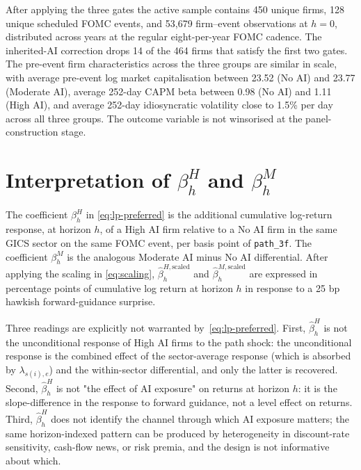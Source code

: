 After applying the three gates the active sample contains 450 unique firms, 128 unique scheduled FOMC events, and 53{,}679 firm--event observations at $h=0$, distributed across years at the regular eight-per-year FOMC cadence. The inherited-AI correction drops 14 of the 464 firms that satisfy the first two gates.
The pre-event firm characteristics across the three groups are similar in scale, with average pre-event log market capitalisation between 23.52 (No AI) and 23.77 (Moderate AI), average 252-day CAPM beta between 0.98 (No AI) and 1.11 (High AI), and average 252-day idiosyncratic volatility close to 1.5\% per day across all three groups. The outcome variable is not winsorised at the panel-construction stage.

\section{Interpretation of \texorpdfstring{$\beta_h^H$}{betaH} and \texorpdfstring{$\beta_h^M$}{betaM}}
\label{sec:emp-interpretation}

The coefficient $\beta_h^H$ in \eqref{eq:lp-preferred} is the additional cumulative log-return response, at horizon $h$, of a High AI firm relative to a No AI firm in the same GICS sector on the same FOMC event, per basis point of \texttt{path\_3f}. The coefficient $\beta_h^M$ is the analogous Moderate AI minus No AI differential. After applying the scaling in \eqref{eq:scaling}, $\hat\beta_h^{H,\text{scaled}}$ and $\hat\beta_h^{M,\text{scaled}}$ are expressed in percentage points of cumulative log return at horizon $h$ in response to a 25 bp hawkish forward-guidance surprise.

Three readings are explicitly not warranted by~\eqref{eq:lp-preferred}. First, $\hat\beta_h^H$ is not the unconditional response of High AI firms to the path shock: the unconditional response is the combined effect of the sector-average response (which is absorbed by $\lambda_{s(i),e}$) and the within-sector differential, and only the latter is recovered. Second, $\hat\beta_h^H$ is not "the effect of AI exposure" on returns at horizon $h$: it is the slope-difference in the response to forward guidance, not a level effect on returns. Third, $\hat\beta_h^H$ does not identify the channel through which AI exposure matters; the same horizon-indexed pattern can be produced by heterogeneity in discount-rate sensitivity, cash-flow news, or risk premia, and the design is not informative about which.

